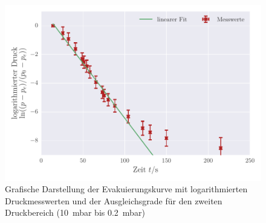 \begin{figure}[!h]
 \centering
 \includegraphics[scale=.80]{../Grafiken/Evakuierungskurve_Drehschieber_log_1.pdf}
 \caption{Grafische Darstellung der Evakuierungskurve mit logarithmierten Druckmesswerten und der Ausgleichsgrade für den zweiten Druckbereich (\SI{10}{\milli\bar} bis \SI{0.2}{\milli\bar}) \label{fig:evakuierungskurve_drehschieber_log_1}}
 \end{figure} 